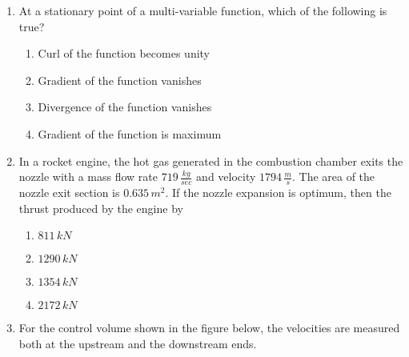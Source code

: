 \documentclass[journal]{IEEEtran}
\begin{document}
\begin{enumerate}
    \begin{enumerate}
        \item $\tau_{xz}=\frac{V_z}{2I_y}\frac{z}{\brak{\frac{h}{2}}}$
        \item $\tau_{xz}=\frac{V_z\brak{\frac{h}{2}}^2}{2I_y}\brak{1-\frac{z^2}{\brak{\frac{h}{2}}^2}}$
        \item $\tau_{xz}=\frac{V_z}{2I_y}\brak{\frac{z}{\brak{\frac{h}{2}}}}^2$
        \item $\tau{_xz}=\frac{V_z\brak{\frac{h}{2}}^2}{2I_y}$
    \end{enumerate}
    \item At a stationary point of a multi-variable function, which of the following is true?
    \begin{enumerate}
        \item Curl of the function becomes unity
        \item Gradient of the function vanishes
        \item Divergence of the function vanishes
        \item Gradient of the function is maximum
    \end{enumerate}
    \item In a rocket engine, the hot gas generated in the combustion chamber exits the nozzle with a mass flow rate $719\,\frac{kg}{sec}$ and velocity $1794\,\frac{m}{s}$. The area of the nozzle exit section is $0.635\,m^2$. If the nozzle expansion is optimum, then the thrust produced by the engine by
        \begin{enumerate}
            \item $811\, kN$
            \item $1290\, kN$
            \item $1354\, kN$
            \item $2172\, kN$
        \end{enumerate}
    \item For the control volume shown in the figure below, the velocities are measured both at the upstream and the downstream ends.


\end{enumerate}
\end{document}
